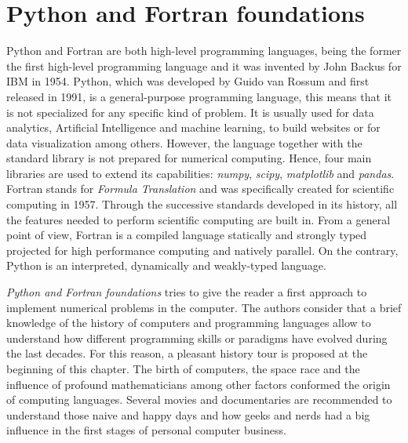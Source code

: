 \chapter{Python and Fortran foundations} 

Python and Fortran are both high-level programming languages, being the former the first high-level programming language and it was invented by John Backus for IBM in 1954.
Python, which was developed by Guido van Rossum and first released in 1991, is a general-purpose programming language, this means that it is not specialized for any specific kind of problem. 
It is usually used for data analytics, Artificial Intelligence and machine learning, to build websites or for data visualization among others. 
However, the language together with the standard library is not prepared for numerical computing.
Hence, four main libraries are used to extend its capabilities: \textit{numpy}, \textit{scipy}, \textit{matplotlib} and \textit{pandas}. 
Fortran stands for \textit{Formula Translation} and was specifically created for scientific computing in 1957.
Through the successive standards developed in its history, all the features needed to perform scientific computing are built in. 
From a general point of view, Fortran is a compiled language statically and strongly typed projected for high performance computing and natively parallel.
On the contrary, Python is an interpreted, dynamically and weakly-typed language. 


\textit{Python and Fortran foundations} tries to give the reader a first approach to implement numerical 
problems in the computer. 
The authors consider that a brief knowledge of the history of 
computers and programming languages allow to understand how different programming skills or paradigms
have evolved during the last decades. For this reason, a pleasant history tour is proposed 
at the beginning of this chapter. The birth of computers, 
the space race and the influence of profound mathematicians among other factors conformed 
the origin of computing languages. Several movies and documentaries are recommended to 
understand those naive and happy days and how geeks and nerds had a big influence in the first 
stages of personal computer business.

